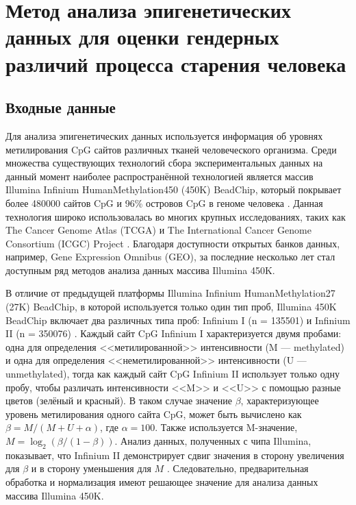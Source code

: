 \chapter{Метод анализа эпигенетических данных для оценки гендерных различий процесса старения человека}\label{ch:ch2}

\section{Входные данные}\label{sec:ch2/sec1}

Для анализа эпигенетических данных используется информация об уровнях метилирования CpG сайтов различных тканей человеческого организма. Среди множества существующих технологий сбора экспериментальных данных на данный момент наиболее распространённой технологией является массив Illumina Infinium HumanMethylation450 (450K) BeadChip, который покрывает более 480000 сайтов CpG и 96\% островов CpG в геноме человека \autocite{Bibikova2011}. Данная технология широко использовалась во многих крупных исследованиях, таких как The Cancer Genome Atlas (TCGA) и The International Cancer Genome Consortium (ICGC) Project \autocite{ICGC2010}. Благодаря доступности открытых банков данных, например, Gene Expression Omnibus (GEO), за последние несколько лет стал доступным ряд методов анализа данных массива Illumina 450K.

В отличие от предыдущей платформы Illumina Infinium HumanMethylation27 (27K) BeadChip, в которой используется только один тип проб, Illumina 450K BeadChip включает два различных типа проб: Infinium I (n = 135501) и Infinium II (n = 350076) \autocite{Bibikova2011}. Каждый сайт CpG Infinium I характеризуется двумя пробами: одна для определения <<метилированной>> интенсивности (M --- methylated) и одна для определения <<неметилированной>> интенсивности (U --- unmethylated), тогда как каждый сайт CpG Infinium II использует только одну пробу, чтобы различать интенсивности <<M>> и <<U>> с помощью разные цветов (зелёный и красный). В таком случае значение $\beta$, характеризующее уровень метилирования одного сайта CpG, может быть вычислено как $\beta = M / (M + U + \alpha)$, где $\alpha = 100$. Также используется M-значение, $M = \log_2 (\beta / (1-\beta))$. Анализ данных, полученных с чипа Illumina, показывает, что Infinium II демонстрирует сдвиг значения в сторону увеличения для $\beta$ и в сторону уменьшения для $M$ \autocite{Dedeurwaerder2011}. Следовательно, предварительная обработка и нормализация имеют решающее значение для анализа данных массива Illumina 450K. 

